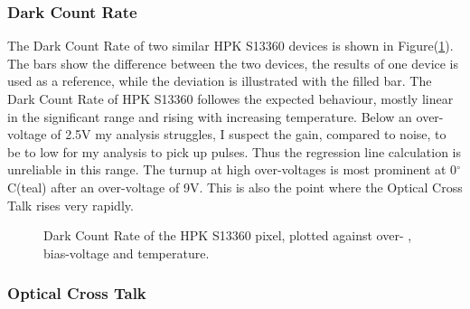 \documentclass[12pt,article,type=msc,colorback,accentcolor=tud9c]{tudthesis}
\begin{document}
\subsubsection{Dark Count Rate}
The Dark Count Rate of two similar HPK S13360 devices is shown in Figure(\ref{fig:S13360_DCR}). The bars show the difference between the two devices, the results of one device is used as a reference, while the deviation is illustrated with the filled bar. The Dark Count Rate of HPK S13360 followes the expected behaviour, mostly linear in the significant range and rising with increasing temperature. Below an over-voltage of 2.5V my analysis struggles, I suspect the gain, compared to noise, to be to low for my analysis to pick up pulses. Thus the regression line calculation is unreliable in this range. The turnup at high over-voltages is most prominent at 0$^{\circ}$C(teal) after an over-voltage of 9V. This is also the point where the Optical Cross Talk rises very rapidly.
\begin{figure}[ht]
\begin{centering}
\caption{Dark Count Rate of the HPK S13360 pixel, plotted against over- , bias-voltage and temperature. }
\label{fig:S13360_DCR}
\end{centering}
\end{figure}

\subsubsection{Optical Cross Talk}
\end{document}

